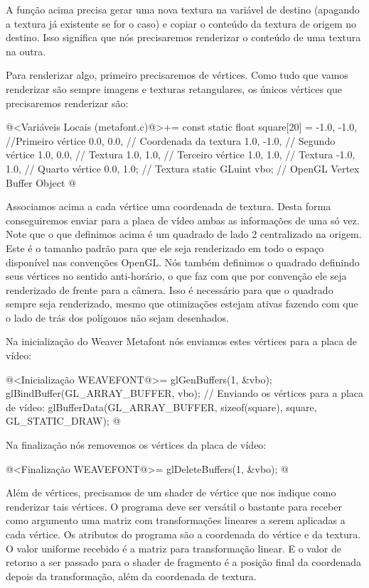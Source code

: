 {{{{{{A função  acima precisa gerar
uma nova textura na variável de destino (apagando a textura já
existente se for o caso) e copiar o conteúdo da textura de origem no
destino. Isso significa que nós precisaremos renderizar o conteúdo de
uma textura na outra.

Para renderizar algo, primeiro precisaremos de vértices. Como tudo que
vamos renderizar são sempre imagens e texturas retangulares, os únicos
vértices que precisaremos renderizar são:

\iniciocodigo
@<Variáveis Locais (metafont.c)@>+=
const static float square[20] = {
  -1.0, -1.0, //Primeiro vértice
  0.0, 0.0, // Coordenada da textura
  1.0, -1.0, // Segundo vértice
  1.0, 0.0, // Textura
  1.0, 1.0, // Terceiro vértice
  1.0, 1.0, // Textura
  -1.0, 1.0, // Quarto vértice
  0.0, 1.0}; // Textura
static GLuint vbo; // OpenGL Vertex Buffer Object
@
\fimcodigo

Associamos acima a cada vértice uma coordenada de textura. Desta forma
conseguiremos enviar para a placa de vídeo ambas as informações de uma
só vez. Note que o que definimos acima é um quadrado de lado 2
centralizado na origem. Este é o tamanho padrão para que ele seja
renderizado em todo o espaço disponível nas convenções OpenGL. Nós
também definimos o quadrado definindo seus vértices no sentido
anti-horário, o que faz com que por convenção ele seja renderizado de
frente para a câmera. Isso é necessário para que o quadrado sempre
seja renderizado, mesmo que otimizações estejam ativas fazendo com que
o lado de trás dos polígonos não sejam desenhados.

Na inicialização do Weaver Metafont nós enviamos estes vértices para
a placa de vídeo:

\iniciocodigo
@<Inicialização WEAVEFONT@>=
glGenBuffers(1, &vbo);
glBindBuffer(GL_ARRAY_BUFFER, vbo);
// Enviando os vértices para a placa de vídeo:
glBufferData(GL_ARRAY_BUFFER, sizeof(square), square, GL_STATIC_DRAW);
@
\fimcodigo

Na finalização nós removemos os vértices da placa de vídeo:

\iniciocodigo
@<Finalização WEAVEFONT@>=
glDeleteBuffers(1, &vbo);
@
\fimcodigo

Além de vértices, precisamos de um shader de vértice que nos indique
como renderizar tais vértices. O programa deve ser versátil o bastante
para receber como argumento uma matriz com transformações lineares a
serem aplicadas a cada vértice. Os atributos do programa são a
coordenada do vértice e da textura. O valor uniforme recebido é a
matriz para transformação linear. E o valor de retorno a ser passado para o shader de
fragmento é a posição final da coordenada depois da transformação,
além da coordenada de textura. 

}}}}}}
